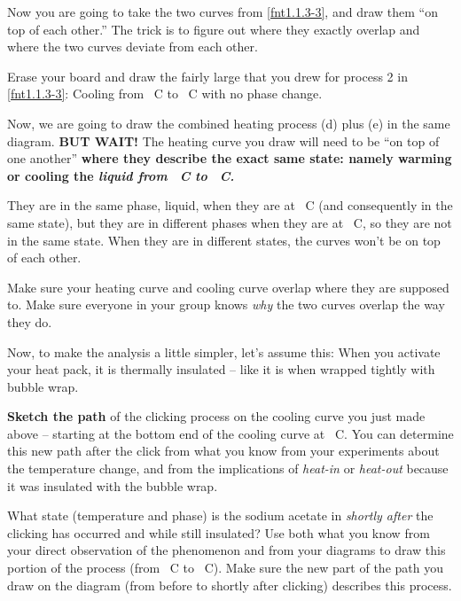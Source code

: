 \begin{benumerate}

	
	Now you are going to take the two curves from \ref{fnt1.1.3-3}, and draw them ``on top of each other.'' The trick is to figure out where they exactly overlap and where the two curves deviate from each other.
	
	Erase your board and draw the \TempGraph{} fairly large that you drew for process 2 in \ref{fnt1.1.3-3}: Cooling from \unit[100]{\textdegree C} to \unit[23]{\textdegree C} with no phase change.
	
	Now, we are going to draw the combined heating process (d) plus (e) in the same diagram. \textbf{BUT WAIT!} The heating curve you draw will need to be ``on top of one another'' \textbf{where they describe the exact same state: namely warming or cooling the {\em liquid from \unit[54]{\textdegree C} to \unit[100]{\textdegree C}.}}
	
	They are in the same phase, liquid, when they are at \unit[100]{\textdegree C} (and consequently in the same state), but they are in different phases when they are at \unit[23]{\textdegree C}, so they are not in the same state. When they are in different states, the curves won't be on top of each other.
	
	Make sure your heating curve and cooling curve overlap where they are supposed to. Make sure everyone in your group knows {\em why} the two curves overlap the way they do.

\WCD

	
	Now, to make the analysis a little simpler, let's assume this: When you activate your heat pack, it is thermally insulated -- like it is when wrapped tightly with bubble wrap.
	
	\textbf{Sketch the path} of the clicking process on the cooling curve you just made above -- starting at the bottom end of the cooling curve at \unit[23]{\textdegree C}. You can determine this new path after the click from what you know from your experiments about the temperature change, and from the implications of {\em heat-in} or {\em heat-out} because it was insulated with the bubble wrap.
	
	What state (temperature and phase) is the sodium acetate in {\em shortly after} the clicking has occurred and while still insulated? Use both what you know from your direct observation of the phenomenon and from your diagrams to draw this portion of the process (from \unit[23]{\textdegree C} to \unit[54]{\textdegree C}). Make sure the new part of the path you draw on the diagram (from before to shortly after clicking) describes this process.
	

\end{benumerate}
